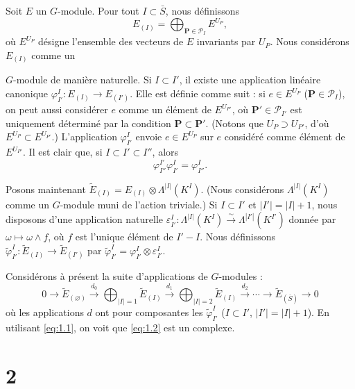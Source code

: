 \documentclass[10pt,a4paper]{article}
\theoremstyle{plain}
\theoremstyle{definition}
\theoremstyle{remark}
\newcommand{\cP}{\mathcal{P}}
\newcommand{\bP}{\mathbf{P}}
\begin{document}
Soit $E$ un $G$-module. Pour tout $I \subset \bar S$, nous définissons
\begin{equation*}
E_{(I)} = \bigoplus_{\bP \in \cP_I} E^{U_P},
\end{equation*}
où $E^{U_P}$ désigne l'ensemble des vecteurs de $E$ invariants par $U_P$. Nous considérons $E_{(I)}$ comme un

\newpage
\noindent $G$-module de manière naturelle. Si $I \subset I'$, il existe une application linéaire canonique $\varphi_{I'}^{I} \colon E_{(I)} \to E_{(I')}$. Elle est définie comme suit : si $e \in E^{U_P}$ ($\bP \in \cP_I$), on peut aussi considérer $e$ comme un élément de $E^{U_{P'}}$, où $\bP' \in \cP_{I'}$ est uniquement déterminé par la condition $\bP \subset \bP'$. (Notons que $U_P \supset U_{P'}$, d'où $E^{U_P} \subset E^{U_{P'}}$.)
L'application $\varphi_{I'}^{I}$ envoie $e \in E^{U_P}$ sur $e$ considéré comme élément de $E^{U_{P'}}$. Il est clair que, si $I \subset I' \subset I''$, alors
\begin{equation}\tag{1.1}\label{eq:1.1}
\varphi_{I''}^{I'} \varphi_{I'}^{I} = \varphi_{I''}^{I}.
\end{equation}

Posons maintenant $\tilde{E}_{(I)} = E_{(I)} \otimes \Lambda^{|I|}(K^I)$. (Nous considérons $\Lambda^{|I|}(K^I)$ comme un $G$-module muni de l'action triviale.) Si $I \subset I'$ et $|I'| = |I| + 1$, nous disposons d'une application naturelle $\varepsilon_{I'}^{I} \colon \Lambda^{|I|}(K^I) \xrightarrow{\;\sim\;} \Lambda^{|I'|}(K^{I'})$ donnée par $\omega \mapsto \omega \wedge f$, où $f$ est l'unique élément de $I' - I$. Nous définissons $\widetilde\varphi_{I'}^{I} \colon \tilde{E}_{(I)} \to \tilde{E}_{(I')}$ par $\widetilde\varphi_{I'}^{I} = \varphi_{I'}^{I} \otimes \varepsilon_{I'}^{I}$.

Considérons à présent la suite d'applications de $G$-modules :
\begin{equation}\tag{1.2}\label{eq:1.2}
0 \to \tilde{E}_{(\varnothing)} \xrightarrow{d_0} \bigoplus_{|I|=1} \tilde{E}_{(I)} \xrightarrow{d_1} \bigoplus_{|I|=2} \tilde{E}_{(I)} \xrightarrow{d_2} \cdots \to \tilde{E}_{(\bar S)} \to 0
\end{equation}
où les applications $d$ ont pour composantes les $\widetilde\varphi_{I'}^{I}$ ($I \subset I'$, $|I'| = |I|+1$). En utilisant \eqref{eq:1.1}, on voit que \eqref{eq:1.2} est un complexe.

\section*{2}
\end{document}
